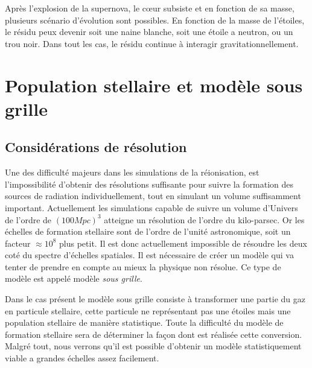 Après l'explosion de la supernova, le cœur subsiste et en fonction de sa masse, plusieurs scénario d'évolution sont possibles.
En fonction de la masse de l'étoiles, le résidu peux devenir soit une naine blanche, soit une étoile a neutron, ou un trou noir.
Dans tout les cas, le résidu continue à interagir gravitationnellement.


\section{Population stellaire et modèle sous grille}

\subsection{Considérations de résolution}

Une des difficulté majeurs dans les simulations de la réionisation, est l'impossibilité d'obtenir des résolutions suffisante pour suivre la formation des sources de radiation individuellement, tout en simulant un volume suffisamment important.
Actuellement les simulations capable de suivre un volume d'Univers de l'ordre de $(100Mpc)^3$ atteigne un résolution de l'ordre du kilo-parsec.
Or les échelles de formation stellaire sont de l'ordre de l'unité astronomique, soit un facteur $\approx 10^8$ plus petit.
Il est donc actuellement impossible de résoudre les deux coté du spectre d'échelles spatiales.
Il est nécessaire de créer un modèle qui va tenter de prendre en compte au mieux la physique non résolue.
Ce type de modèle est appelé modèle \textit{sous grille}.

Dans le cas présent le modèle sous grille consiste à transformer une partie du gaz en particule stellaire, cette particule ne représentant pas une étoiles mais une population stellaire de manière statistique.
Toute la difficulté du modèle de formation stellaire sera de déterminer la façon dont est réalisée cette conversion.
Malgré tout, nous verrons qu'il est possible d'obtenir un modèle statistiquement viable a grandes échelles assez facilement.

